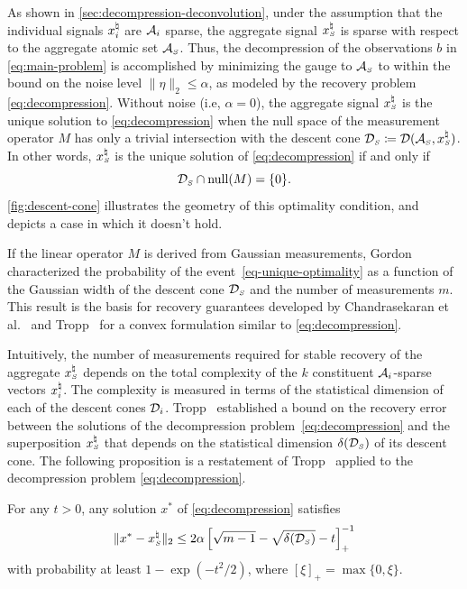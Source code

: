 As shown in \autoref{sec:decompression-deconvolution}, under the assumption that the individual signals $x_i^{\natural}$ are $\mathcal{A}_i$ sparse, the aggregate signal $x_{\scriptscriptstyle S}^\natural$ is sparse with respect to the aggregate atomic set $\mathcal{A}_{\scriptscriptstyle S}$.
Thus, the decompression of the observations $b$ in \eqref{eq:main-problem} is accomplished by minimizing the gauge to $\mathcal{A}_{\scriptscriptstyle S}$ to within the bound on the noise level $\|\eta\|_2\le\alpha$, as modeled by the recovery problem \eqref{eq:decompression}.
Without noise (i.e, $\alpha=0$), the aggregate signal $x_{\scriptscriptstyle S}^\natural$ is the unique solution to \eqref{eq:decompression} when the null space of the measurement operator $M$ has only a trivial intersection with the descent cone $\mathcal{D}_{\scriptscriptstyle S}\coloneqq\mathcal{D}(\mathcal{A}_{\scriptscriptstyle S}, x_{\scriptscriptstyle S}^\natural)$. 
In other words, $x_{\scriptscriptstyle S}^\natural$ is the unique solution of \eqref{eq:decompression} if and only if 
\begin{equation}\label{eq-unique-optimality}
  \mathcal{D}_{\scriptscriptstyle S}\cap\operatorname{null}(M) = \{0\}.  
\end{equation}
\autoref{fig:descent-cone} illustrates the geometry of this optimality condition, and depicts a case in which it doesn't hold.

If the linear operator $M$ is derived from Gaussian measurements, Gordon~\cite{gordon1988milman} characterized the probability of the event~\eqref{eq-unique-optimality} as a function of the Gaussian width of the descent cone $\mathcal{D}_{\scriptscriptstyle S}$ and the number of measurements $m$. This result is the basis for recovery guarantees developed by Chandrasekaran et al.~\cite{chandrasekaran2012convex} and Tropp~\cite{tropp2015convex} for a convex formulation similar to \eqref{eq:decompression}.

Intuitively, the number of measurements required for stable recovery of the aggregate $x_{\scriptscriptstyle S}^\natural$ depends on the total complexity of the $k$ constituent $\mathcal{A}_i$-sparse vectors $x_i^{\natural}$. The complexity is measured in terms of the statistical dimension of each of the descent cones $\mathcal{D}_i$. Tropp~\cite[Corollary~3.5]{tropp2015convex} established a bound on the recovery error between the solutions of the decompression problem~\eqref{eq:decompression} and the superposition $x_{\scriptscriptstyle S}^{\natural}$ that depends on the statistical dimension $\delta(\mathcal{D}_{\scriptscriptstyle S})$ of its descent cone. The following proposition is a restatement of Tropp~\cite[Corollary~3.5]{tropp2015convex} applied to the decompression problem \eqref{eq:decompression}.

\begin{proposition}%
    \label{thm:tropp}
    For any $t>0$, any solution $x^*$ of \eqref{eq:decompression} satisfies
    \begin{equation*}
        \|x^* - x_{\scriptscriptstyle S}^\natural\|_2 \leq 2\alpha\left[\sqrt{m - 1} - \sqrt{\delta(\mathcal{D}_{\scriptscriptstyle S})} - t\right]_+^{-1}
    \end{equation*}
    with probability at least $1 - \exp(-t^2/2)$, where $[\xi]_+=\max\{0,\xi\}$. 
\end{proposition}

